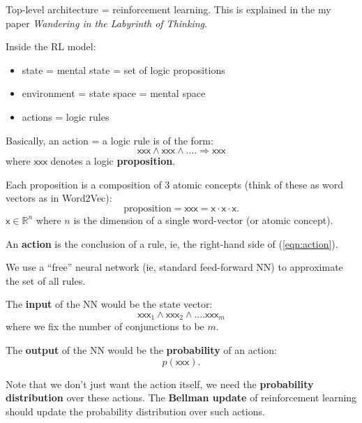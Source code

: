 

\title{}
\author{ {\footnotesize general.intelligence@gmail.com}}



	\setlength{\parindent}{0pt}
	\setlength{\parskip}{2.8ex plus0.8ex minus0.8ex}
	
	\maketitle
	


Top-level architecture = reinforcement learning.  This is explained in the my paper \textit{Wandering in the Labyrinth of Thinking}.

Inside the RL model:
\begin{itemize}
	\item state = mental state = set of logic propositions
	\item environment = state space = mental space
	\item actions = logic rules
\end{itemize}

Basically, an action = a logic rule is of the form:
\begin{equation}
\label{eqn:action}
\mathsf{xxx} \wedge \mathsf{xxx} \wedge .... \Rightarrow \mathsf{xxx}
\end{equation}
where $\mathsf{xxx}$ denotes a logic \textbf{proposition}.

Each proposition is a composition of 3 atomic concepts (think of these as word vectors as in Word2Vec):
\begin{equation}
\mbox{proposition} = \mathsf{xxx} = \mathsf{x} \cdot \mathsf{x} \cdot \mathsf{x}.
\end{equation}
$\mathsf{x} \in \mathbb{R}^n$ where $n$ is the dimension of a single word-vector (or atomic concept).

An \textbf{action} is the conclusion of a rule, ie, the right-hand side of (\ref{eqn:action}).

We use a ``free'' neural network (ie, standard feed-forward NN) to approximate the set of all rules.

The \textbf{input} of the NN would be the state vector:
\begin{equation}
\mathsf{xxx}_1 \wedge \mathsf{xxx}_2 \wedge .... \mathsf{xxx}_m
\end{equation}
where we fix the number of conjunctions to be $m$.

The \textbf{output} of the NN would be the \textbf{probability} of an action:
\begin{equation}
p(\mathsf{xxx}).
\end{equation}

Note that we don't just want the action itself, we need the \textbf{probability distribution} over these actions.  The \textbf{Bellman update} of reinforcement learning should update the probability distribution over such actions.

